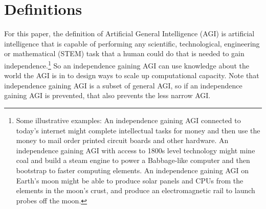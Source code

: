 \documentclass[letterpaper,twocolumn]{article}
\begin{document}


\section{Definitions}


For this paper, the definition of Artificial General Intelligence
(AGI) is artificial intelligence that is capable of performing any
scientific, technological, engineering or mathematical (STEM) task
that a human could do that is needed to gain
independence.\footnote{Some illustrative examples: An
independence gaining AGI connected to today's internet might complete
intellectual tasks for money and then use the money to mail order
printed circuit boards and other hardware. An independence gaining AGI
with access to 1800s level technology might mine coal and build a
steam engine to power a Babbage-like computer and then bootstrap to
faster computing elements. An independence gaining AGI on Earth's moon
might be able to produce solar panels and CPUs from the elements in
the moon's crust, and produce an electromagnetic rail to launch probes
off the moon.}  So an independence gaining AGI can use knowledge about
the world the AGI is in to design ways to scale up computational
capacity.  Note that independence gaining AGI is a subset of general
AGI, so if an independence gaining AGI is prevented, that also
prevents the less narrow AGI.
\end{document}
